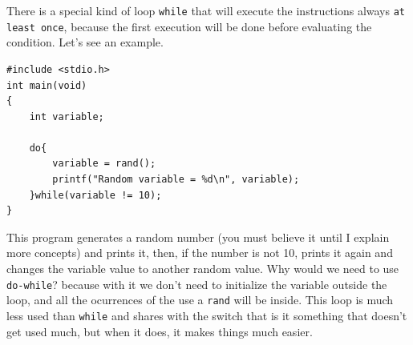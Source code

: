 \documentclass[a4paper]{article}
\begin{document}
There is a special kind of loop \texttt{while} that will execute the
instructions always \texttt{at least once}, because the first execution will be
done before evaluating the condition. Let's see an example.

\noindent
\begin{minipage}[H]{\linewidth}
\mbox{}
\begin{lstlisting}[style=C,
caption={Example of a program with a \texttt{do-while} loop},
label={lst:doWhile}]
#include <stdio.h>
int main(void)
{
    int variable;

    do{
        variable = rand();
        printf("Random variable = %d\n", variable);
    }while(variable != 10);
}
\end{lstlisting}
\end{minipage}

This program generates a random number (you must believe it until I explain more
concepts) and prints it, then, if the number is not 10, prints it again and
changes the variable value to another random value. Why would we need to use
\texttt{do-while}? because with it we don't need to initialize the variable
outside the loop, and all the ocurrences of the use a \texttt{rand} will be
inside. This loop is much less used than \texttt{while} and shares with the
switch that is it something that doesn't get used much, but when it does,
it makes things much easier.
\end{document}
